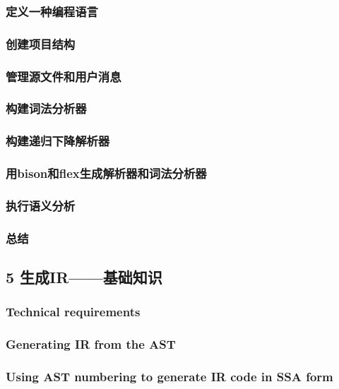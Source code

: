 \documentclass[11pt,a4paper,UTF8]{ctexart}
\begin{document}
		\subsubsection{定义一种编程语言}
		\subsubsection{创建项目结构}
		\subsubsection{管理源文件和用户消息}
		\subsubsection{构建词法分析器}
		\subsubsection{构建递归下降解析器}
		\subsubsection{用bison和flex生成解析器和词法分析器}
		\subsubsection{执行语义分析}
		\subsubsection{总结}
	\subsection{5 生成IR——基础知识}
		\subsubsection{Technical requirements}
		\subsubsection{Generating IR from the AST}
		\subsubsection{Using AST numbering to generate IR code in SSA form}
\end{document}
